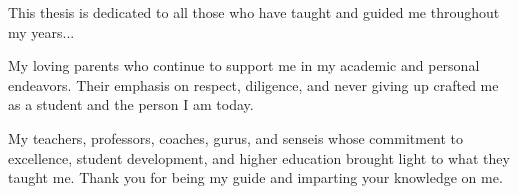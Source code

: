 \documentclass[12pt,american]{report}
\begin{document}
\copyrightfalse%
{}

\beforepreface%

\vfill
\begin{center}
This thesis is dedicated to all those who have taught and guided me throughout my years... 


My loving parents who continue to support me in my academic and personal endeavors.  Their emphasis on respect, diligence, and never giving up crafted me as a student and the person I am today.  


My teachers, professors, coaches, gurus, and senseis whose commitment to excellence, student development, and higher education brought light to what they taught me.  Thank you for being my guide and imparting your knowledge on me.
\end{center}
\vfill
\end{document}
